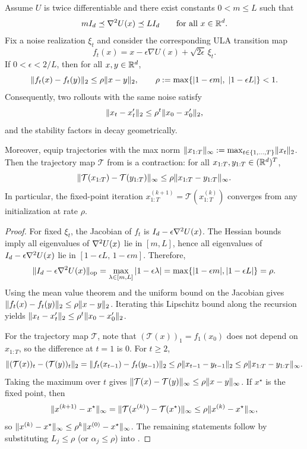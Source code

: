 \documentclass[11pt]{article}
\begin{document}
\begin{proposition}
\label{prop:ula-contracting-regime}
Assume $U$ is twice differentiable and there exist constants $0<m\le L$ such that
\[
m I_d \preceq \nabla^2 U(x) \preceq L I_d \qquad \text{for all } x\in\mathbb{R}^d.
\]
Fix a noise realization $\xi_t$ and consider the corresponding ULA transition map
\[
f_t(x)=x-\epsilon\nabla U(x)+\sqrt{2\epsilon}\,\xi_t.
\]
If $0<\epsilon<2/L$, then for all $x,y\in\mathbb{R}^d$,
\[
\lVert f_t(x)-f_t(y)\rVert_2 \le \rho \lVert x-y\rVert_2,
\qquad \rho := \max\{|1-\epsilon m|,\; |1-\epsilon L|\} < 1.
\]
Consequently, two rollouts with the same noise satisfy
\[
\lVert x_t-x'_t\rVert_2 \le \rho^t \lVert x_0-x_0'\rVert_2,
\]
and the stability factors in  decay geometrically.

Moreover, equip trajectories with the max norm $\lVert x_{1:T}\rVert_\infty:=\max_{t\in\{1,\dots,T\}}\lVert x_t\rVert_2$.
Then the trajectory map $\mathcal{T}$ from  is a contraction:
for all $x_{1:T},y_{1:T}\in(\mathbb{R}^d)^T$,
\[
\lVert\mathcal{T}(x_{1:T})-\mathcal{T}(y_{1:T})\rVert_\infty \le \rho \lVert x_{1:T}-y_{1:T}\rVert_\infty.
\]
In particular, the fixed-point iteration $x_{1:T}^{(k+1)}=\mathcal{T}(x_{1:T}^{(k)})$ converges from any initialization at rate $\rho$.%
\end{proposition}
\begin{proof}
For fixed $\xi_t$, the Jacobian of $f_t$ is $I_d-\epsilon \nabla^2 U(x)$.
The Hessian bounds imply all eigenvalues of $\nabla^2 U(x)$ lie in $[m,L]$, hence all eigenvalues of $I_d-\epsilon \nabla^2 U(x)$ lie in $[1-\epsilon L,\,1-\epsilon m]$.
Therefore,
\[
\lVert I_d-\epsilon \nabla^2 U(x)\rVert_{\mathrm{op}}
= \max_{\lambda\in[m,L]} |1-\epsilon\lambda|
= \max\{|1-\epsilon m|,|1-\epsilon L|\}
= \rho.
\]
Using the mean value theorem and the uniform bound on the Jacobian gives $\lVert f_t(x)-f_t(y)\rVert_2\le \rho \lVert x-y\rVert_2$.
Iterating this Lipschitz bound along the recursion yields $\lVert x_t-x'_t\rVert_2\le \rho^t \lVert x_0-x_0'\rVert_2$.

For the trajectory map $\mathcal{T}$, note that $(\mathcal{T}(x))_1=f_1(x_0)$ does not depend on $x_{1:T}$, so the difference at $t=1$ is $0$.
For $t\ge 2$,
\[
\lVert(\mathcal{T}(x))_t-(\mathcal{T}(y))_t\rVert_2
=\lVert f_t(x_{t-1})-f_t(y_{t-1})\rVert_2
\le \rho \lVert x_{t-1}-y_{t-1}\rVert_2
\le \rho \lVert x_{1:T}-y_{1:T}\rVert_\infty.
\]
Taking the maximum over $t$ gives $\lVert\mathcal{T}(x)-\mathcal{T}(y)\rVert_\infty\le \rho \lVert x-y\rVert_\infty$.
If $x^\star$ is the fixed point, then
\[
\lVert x^{(k+1)}-x^\star\rVert_\infty
=\lVert\mathcal{T}(x^{(k)})-\mathcal{T}(x^\star)\rVert_\infty
\le \rho \lVert x^{(k)}-x^\star\rVert_\infty,
\]
so $\lVert x^{(k)}-x^\star\rVert_\infty\le \rho^k\lVert x^{(0)}-x^\star\rVert_\infty$.
The remaining statements follow by substituting $L_j\le \rho$ (or $\alpha_j\le \rho$) into .%
\end{proof}
\end{document}
